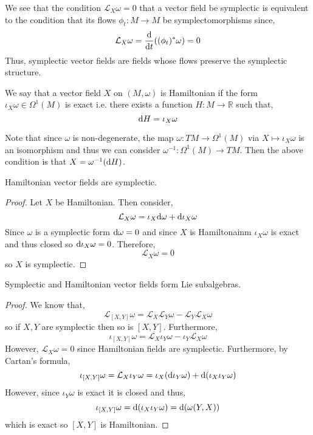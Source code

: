 \documentclass[12pt]{extarticle}
\renewcommand{\L}{\mathcal{L}}
\newcommand{\R}{\mathbb{R}}
\begin{document}
\begin{remark}
We see that the condition $\L_X \omega = 0$ that a vector field be symplectic is equivalent to the condition that its flows $\phi_t :  M \to M$ be symplectomorphisms since,
\[ \L_X \omega = \deriv{}{t} ((\phi_t)^* \omega) = 0 \]
Thus, symplectic vector fields are fields whose flows preserve the symplectic structure.
\end{remark}

\begin{definition}
We say that a vector field $X$ on $(M, \omega)$ is Hamiltonian if the form $\iota_X \omega \in \Omega^1(M)$ is exact i.e. there exists a function $H : M \to \R$ such that,
\[ \mathrm{d}{H} = \iota_X \omega \]
\end{definition}

\begin{remark}
Note that since $\omega$ is non-degenerate, the map $\omega : TM \to \Omega^1(M)$ via $X \mapsto \iota_X \omega$ is an isomorphism and thus we can consider $\omega^{-1} : \Omega^1(M) \to TM$. Then the above condition is that $X = \omega^{-1}(\mathrm{d}{H})$. 
\end{remark}

\begin{lemma}
Hamiltonian vector fields are symplectic.
\end{lemma}

\begin{proof}
Let $X$ be Hamiltonian. Then consider,
\[ \L_X \omega = \iota_X \d \omega + \d \iota_X \omega \]
Since $\omega$ is a symplectic form $\mathrm{d}{\omega} = 0$ and since $X$ is Hamiltonainm $\iota_X \omega$ is exact and thus closed so $\mathrm{d} \iota_X \omega = 0$. Therefore,
\[ \L_X \omega = 0 \]
so $X$ is symplectic.
\end{proof}

\begin{lemma}
Symplectic and Hamiltonian vector fields form Lie subalgebras.
\end{lemma}

\begin{proof}
We know that,
\[ \L_{[X,Y]} \omega = \L_X \L_Y \omega - \L_Y \L_X \omega \]
so if $X,Y$ are symplectic then so is $[X, Y]$. Furthermore, 
\[ \iota_{[X, Y]} \omega = \L_X \iota_Y \omega - \iota_Y \L_X \omega \]
However, $\L_X \omega = 0$ since Hamiltonian fields are symplectic. Furthermore, by Cartan's formula,
\[ \iota_{[X, Y]} \omega = \L_X \iota_Y \omega = \iota_X (\d \iota_Y \omega) + \d( \iota_X \iota_Y \omega) \]
However, since $\iota_Y \omega$ is exact it is closed and thus,
\[ \iota_{[X, Y]} \omega = \mathrm{d} (\iota_X \iota_Y \omega) = \mathrm{d}{(\omega(Y, X))} \]
which is exact so $[X, Y]$ is Hamiltonian. 
\end{proof}
\end{document}
